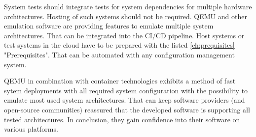 System tests should integrate tests for system dependencies for multiple hardware architectures. Hosting of such systems should not be required. \gls{QEMU} and other emulation software are providing features to emulate multiple system architectures.
That can be integrated into the \gls{CI/CD} pipeline. Host systems or test systems in the cloud have to be prepared with the listed \ref{ch:prequisites} "Prerequisites". That can be automated with any configuration management system.

\gls{QEMU} in combination with container technologies exhibits a method of fast sytem deployments with all required system configuration with the possibility to emulate most used system architectures. That can keep software providers (and open-source communities) reassured that the developed software is supporting all tested architectures. 
In conclusion, they gain confidence into their software on various platforms.
